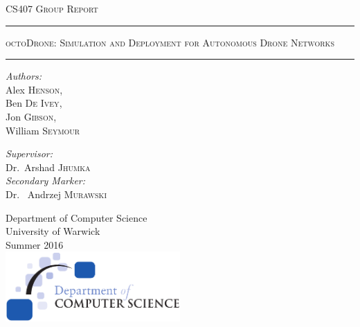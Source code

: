 \documentclass[10pt,a4paper,twoside]{report}
\begin{document}
\begin{titlepage}
\begin{center}

\textsc{\LARGE CS407 Group Report}\\[1.5cm]
\vspace{1.5cm}

\hrule
\vspace{0.2cm}
\textsc{\LARGE octoDrone: Simulation and Deployment for Autonomous Drone Networks}\\
\vspace{0.2cm}
\hrule

\vspace{1.5cm}
\noindent
\begin{minipage}{0.4\textwidth}
	\begin{flushleft} \large
		\emph{Authors:}\\
		Alex \textsc{Henson}, \\ Ben \textsc{De Ivey}, \\ Jon \textsc{Gibson}, \\ William \textsc{Seymour} 
	\end{flushleft}
\end{minipage}%
\begin{minipage}{0.4\textwidth}
	\begin{flushright} \large
		\emph{Supervisor:} \\
		Dr.~Arshad \textsc{Jhumka} \\
		\emph{Secondary Marker:} \\
		Dr.~ Andrzej \textsc{Murawski} 
	\end{flushright}
\end{minipage}
\vfill
\large Department of Computer Science\\
\large University of Warwick\\
\large Summer 2016\\
\vfill
\includegraphics[width=0.50\textwidth]{img/dcslogo.png}~\\[1cm]
\end{center}
\end{titlepage}

\end{document}
